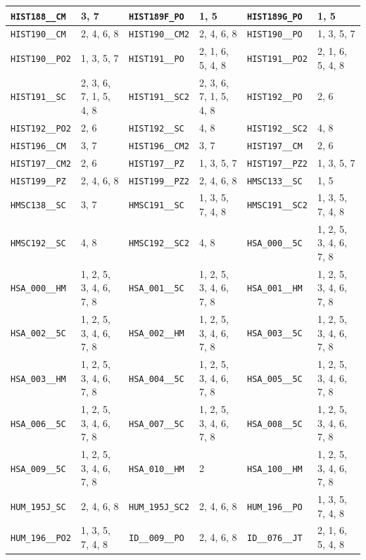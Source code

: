 \begin{longtable}{|l|l||l|l||l|l|}
    \verb|HIST188__CM| & 3, 7 & \verb|HIST189F_PO| & 1, 5 & \verb|HIST189G_PO| & 1, 5\\\hline
    \verb|HIST190__CM| & 2, 4, 6, 8 & \verb|HIST190__CM2| & 2, 4, 6, 8 & \verb|HIST190__PO| & 1, 3, 5, 7\\\hline
    \verb|HIST190__PO2| & 1, 3, 5, 7 & \verb|HIST191__PO| & 2, 1, 6, 5, 4, 8 & \verb|HIST191__PO2| & 2, 1, 6, 5, 4, 8\\\hline
    \verb|HIST191__SC| & 2, 3, 6, 7, 1, 5, 4, 8 & \verb|HIST191__SC2| & 2, 3, 6, 7, 1, 5, 4, 8 & \verb|HIST192__PO| & 2, 6\\\hline
    \verb|HIST192__PO2| & 2, 6 & \verb|HIST192__SC| & 4, 8 & \verb|HIST192__SC2| & 4, 8\\\hline
    \verb|HIST196__CM| & 3, 7 & \verb|HIST196__CM2| & 3, 7 & \verb|HIST197__CM| & 2, 6\\\hline
    \verb|HIST197__CM2| & 2, 6 & \verb|HIST197__PZ| & 1, 3, 5, 7 & \verb|HIST197__PZ2| & 1, 3, 5, 7\\\hline
    \verb|HIST199__PZ| & 2, 4, 6, 8 & \verb|HIST199__PZ2| & 2, 4, 6, 8 & \verb|HMSC133__SC| & 1, 5\\\hline
    \verb|HMSC138__SC| & 3, 7 & \verb|HMSC191__SC| & 1, 3, 5, 7, 4, 8 & \verb|HMSC191__SC2| & 1, 3, 5, 7, 4, 8\\\hline
    \verb|HMSC192__SC| & 4, 8 & \verb|HMSC192__SC2| & 4, 8 & \verb|HSA_000__5C| & 1, 2, 5, 3, 4, 6, 7, 8\\\hline
    \verb|HSA_000__HM| & 1, 2, 5, 3, 4, 6, 7, 8 & \verb|HSA_001__5C| & 1, 2, 5, 3, 4, 6, 7, 8 & \verb|HSA_001__HM| & 1, 2, 5, 3, 4, 6, 7, 8\\\hline
    \verb|HSA_002__5C| & 1, 2, 5, 3, 4, 6, 7, 8 & \verb|HSA_002__HM| & 1, 2, 5, 3, 4, 6, 7, 8 & \verb|HSA_003__5C| & 1, 2, 5, 3, 4, 6, 7, 8\\\hline
    \verb|HSA_003__HM| & 1, 2, 5, 3, 4, 6, 7, 8 & \verb|HSA_004__5C| & 1, 2, 5, 3, 4, 6, 7, 8 & \verb|HSA_005__5C| & 1, 2, 5, 3, 4, 6, 7, 8\\\hline
    \verb|HSA_006__5C| & 1, 2, 5, 3, 4, 6, 7, 8 & \verb|HSA_007__5C| & 1, 2, 5, 3, 4, 6, 7, 8 & \verb|HSA_008__5C| & 1, 2, 5, 3, 4, 6, 7, 8\\\hline
    \verb|HSA_009__5C| & 1, 2, 5, 3, 4, 6, 7, 8 & \verb|HSA_010__HM| & 2 & \verb|HSA_100__HM| & 1, 2, 5, 3, 4, 6, 7, 8\\\hline
    \verb|HUM_195J_SC| & 2, 4, 6, 8 & \verb|HUM_195J_SC2| & 2, 4, 6, 8 & \verb|HUM_196__PO| & 1, 3, 5, 7, 4, 8\\\hline
    \verb|HUM_196__PO2| & 1, 3, 5, 7, 4, 8 & \verb|ID__009__PO| & 2, 4, 6, 8 & \verb|ID__076__JT| & 2, 1, 6, 5, 4, 8\\\hline

\end{longtable}
